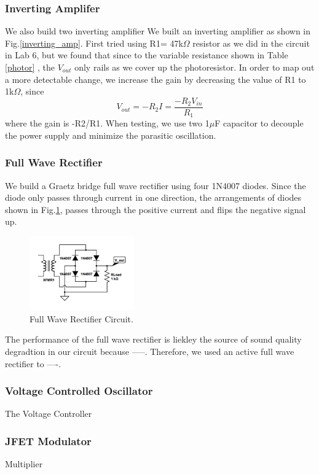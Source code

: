\documentclass[twocolumn]{article}
\begin{document}
\subsubsection{Inverting Amplifer}
\par We also build two inverting amplifier 
We built an inverting amplifier as shown in Fig.\ref{inverting_amp}. First tried using R1= 47k$\Omega$ resistor as we did in the circuit in Lab 6, but we found that since to the variable resistance shown in Table \ref{photor} , the $V_{out}$ only rails as we cover up the photoresistor. In order to map out a more detectable change, we increase the gain by decreasing the value of R1 to 1k$\Omega$, since
\begin{equation}
V_{out} = -R_2I = \frac{-R_2V_{in}}{R_1}
\end{equation}
where the gain is -R2/R1. When testing, we use two 1$\mu$F capacitor to decouple the power supply and minimize the parasitic oscillation. 

\subsubsection{Full Wave Rectifier}
We build a Graetz bridge full wave rectifier using four 1N4007 diodes. Since the diode only passes through current in one direction, the arrangements of diodes shown in Fig.\ref{rectifier}, passes through the positive current and flips the negative signal up.
\begin{figure}[h!]
 \centering
 \includegraphics[width=0.4\textwidth]{figure/full_wave_rectifier.jpg}
\caption{Full Wave Rectifier Circuit.}
\label{rectifier}
\end{figure}
\par The performance of the full wave rectifier is liekley the source of sound quality degradtion in our circuit because -----. Therefore, we used an active full wave rectifier to ----.
\subsubsection{Voltage Controlled Oscillator}
The Voltage Controller 
\subsubsection{JFET Modulator}
Multiplier
\end{document}
